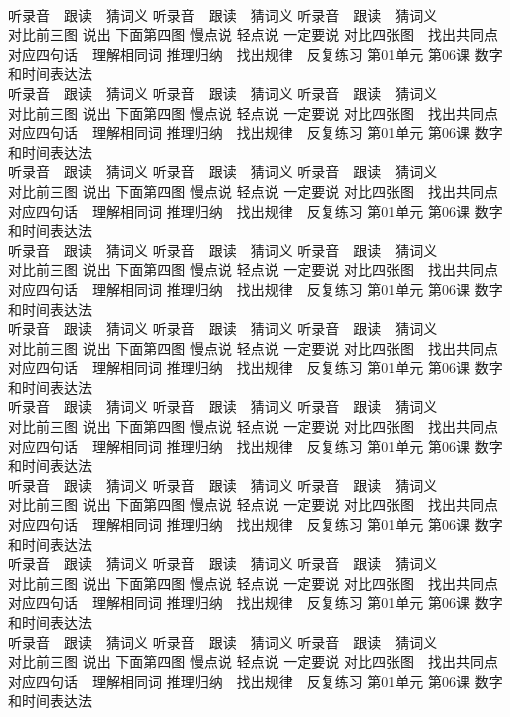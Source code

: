 \documentclass[8pt]{extreport}
\begin{document}
\begin{CJK}{UTF8}{min}
\\	听录音　跟读　猜词义 听录音　跟读　猜词义 听录音　跟读　猜词义 
\\	对比前三图 说出 下面第四图 慢点说 轻点说 一定要说	对比四张图　找出共同点 对应四句话　理解相同词 推理归纳　找出规律　反复练习 第01单元 第06课 数字和时间表达法
\\	听录音　跟读　猜词义 听录音　跟读　猜词义 听录音　跟读　猜词义 
\\	对比前三图 说出 下面第四图 慢点说 轻点说 一定要说	对比四张图　找出共同点 对应四句话　理解相同词 推理归纳　找出规律　反复练习 第01单元 第06课 数字和时间表达法
\\	听录音　跟读　猜词义 听录音　跟读　猜词义 听录音　跟读　猜词义 
\\	对比前三图 说出 下面第四图 慢点说 轻点说 一定要说	对比四张图　找出共同点 对应四句话　理解相同词 推理归纳　找出规律　反复练习 第01单元 第06课 数字和时间表达法
\\	听录音　跟读　猜词义 听录音　跟读　猜词义 听录音　跟读　猜词义 
\\	对比前三图 说出 下面第四图 慢点说 轻点说 一定要说	对比四张图　找出共同点 对应四句话　理解相同词 推理归纳　找出规律　反复练习 第01单元 第06课 数字和时间表达法
\\	听录音　跟读　猜词义 听录音　跟读　猜词义 听录音　跟读　猜词义 
\\	对比前三图 说出 下面第四图 慢点说 轻点说 一定要说	对比四张图　找出共同点 对应四句话　理解相同词 推理归纳　找出规律　反复练习 第01单元 第06课 数字和时间表达法
\\	听录音　跟读　猜词义 听录音　跟读　猜词义 听录音　跟读　猜词义 
\\	对比前三图 说出 下面第四图 慢点说 轻点说 一定要说	对比四张图　找出共同点 对应四句话　理解相同词 推理归纳　找出规律　反复练习 第01单元 第06课 数字和时间表达法
\\	听录音　跟读　猜词义 听录音　跟读　猜词义 听录音　跟读　猜词义 
\\	对比前三图 说出 下面第四图 慢点说 轻点说 一定要说	对比四张图　找出共同点 对应四句话　理解相同词 推理归纳　找出规律　反复练习 第01单元 第06课 数字和时间表达法
\\	听录音　跟读　猜词义 听录音　跟读　猜词义 听录音　跟读　猜词义 
\\	对比前三图 说出 下面第四图 慢点说 轻点说 一定要说	对比四张图　找出共同点 对应四句话　理解相同词 推理归纳　找出规律　反复练习 第01单元 第06课 数字和时间表达法
\\	听录音　跟读　猜词义 听录音　跟读　猜词义 听录音　跟读　猜词义 
\\	对比前三图 说出 下面第四图 慢点说 轻点说 一定要说	对比四张图　找出共同点 对应四句话　理解相同词 推理归纳　找出规律　反复练习 第01单元 第06课 数字和时间表达法

\end{CJK}
\end{document}
